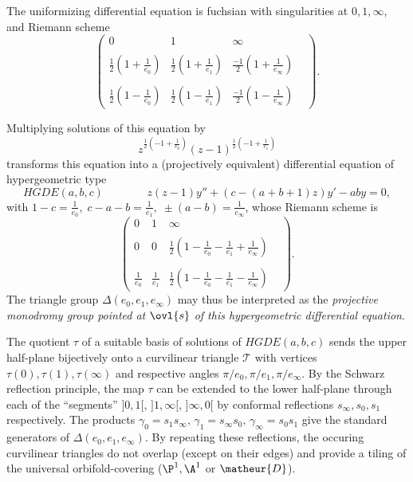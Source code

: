 \begin{para}\label{para::5.1.2} The uniformizing differential equation is
 fuchsian with singularities at $0,1,\infty$, and Riemann scheme 
\begin{equation*}
\begin{pmatrix}
 0 &  1 & \infty \\
 &&&\\
 \frac{1}{2}(1+\frac{1}{e_0})& \frac{1}{2}(1+\frac{1}{e_{1}})&
 \frac{-1}{2}(1+\frac{1}{e_{\infty}}) \\ 
 &&& \\
 \frac{1}{2}(1-\frac{1}{e_0})& \frac{1}{2}(1-\frac{1}{e_{1}})&
 \frac{-1}{2}(1-\frac{1}{e_{\infty}})
\end{pmatrix} .
\end{equation*}

 \medskip Multiplying solutions of this equation by  
\begin{equation*}
 z^{\frac{1}{2}(-1+\frac{1}{e_0})}(z-1)^{\frac{1}{2}(-1+\frac{1}{e_1})}
\end{equation*}
transforms this equation into a (projectively equivalent) differential equation of hypergeometric type
\begin{equation*}
 HGDE(a,b,c)\;\;\;\;\;\;\;\;\;\;\;\;\;\; z(z-1)y''+(c-(a+b+1)z)y'-ab y=0,  
\end{equation*}
with $1-c=\frac{1}{e_0},\;c-a-b=\frac{1}{e_1},\; \pm(a-b)=\frac{1}{e_\infty}$, whose Riemann scheme is    
 \begin{equation*}
  \begin{pmatrix}
   0 &  1 & \infty \\
   &&&\\
   0& 0& \frac{1}{2}(1-\frac{1}{e_0}-\frac{1}{e_1}+\frac{1}{e_{\infty}}) \\
   &&&\\
   \frac{1}{e_0}&\frac{1}{e_{1}}&
   \frac{1}{2}(1-\frac{1}{e_0}-\frac{1}{e_1}-\frac{1}{e_{\infty}})
  \end{pmatrix} .
 \end{equation*}
 The triangle group $\Delta(e_0,e_1,e_\infty)$ may thus be interpreted
 as the {\it projective monodromy group pointed at $\ovl{s}$ of this
 hypergeometric differential equation}.
\end{para}

\begin{para}\label{para::5.1.3} The quotient $\tau$ of a suitable basis of
 solutions of $ HGDE(a,b,c)$ sends the upper half-plane bijectively 
onto a curvilinear triangle $\mathcal{T}$ with vertices
 $\tau(0),\tau(1),\tau(\infty)$ and respective angles 
$\pi/e_0,\pi/e_1,\pi/e_\infty$. By the Schwarz reflection principle, the
 map $\tau$ can be extended to the lower half-plane 
through each of the ``segments'' $]0,1[$, $]1,\infty[$, $]\infty,0[$ by
 conformal reflections $s_\infty,s_0,s_1$ respectively. The products 
$\gamma_0=s_1s_\infty,\,\gamma_1=s_\infty s_0,\,\gamma_\infty=s_0s_1 $
 give the standard generators of $\Delta(e_0,e_1,e_\infty)$. By
 repeating these reflections, the occuring curvilinear triangles do not
 overlap (except on their edges) and provide a tiling of the universal
orbifold-covering ($\P^1, \A^1$ or $\matheur{D}$).
\end{para}

